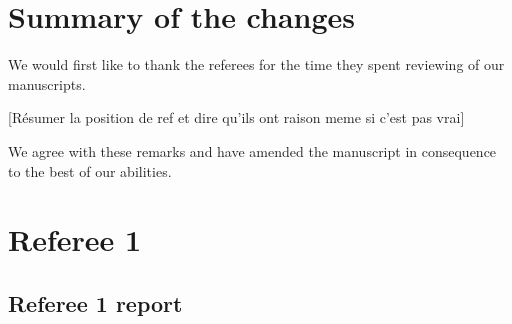 \documentclass{article}
\begin{document}
\section*{Summary of the changes}

We would first like to thank the referees for the time they spent reviewing of our manuscripts.

[Résumer la position de ref et dire qu'ils ont raison meme si c'est pas vrai]

We agree with these remarks and have amended the manuscript in consequence to the best of our abilities.

\section*{Referee 1}
\subsection*{Referee 1 report}
\end{document}
